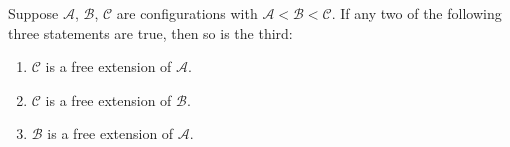 Suppose $\mathcal{A}$, $\mathcal{B}$, $\mathcal{C}$ are configurations with $\mathcal{A} < \mathcal{B} < \mathcal{C}$. If any two of the following three statements are true, then so is the third:
\begin{enumerate}
  \item[(a)] $\mathcal{C}$ is a free extension of $\mathcal{A}$.
  \item[(b)] $\mathcal{C}$ is a free extension of $\mathcal{B}$.
  \item[(c)] $\mathcal{B}$ is a free extension of $\mathcal{A}$.
\end{enumerate}
